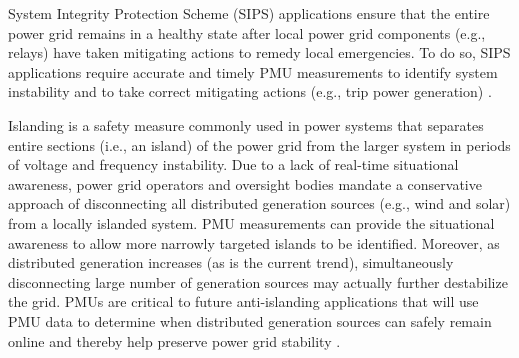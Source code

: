System Integrity Protection Scheme (SIPS) applications ensure that the entire power grid remains in a healthy state after local power grid components (e.g., relays) 
have taken mitigating actions to remedy local emergencies.  
To do so, SIPS applications require accurate and timely PMU measurements to identify system instability and to take correct mitigating actions (e.g., trip power generation) \cite{Bakken11}.



Islanding is a safety measure commonly used in power systems that separates entire sections (i.e., an island) of the power grid from the larger system in periods of voltage and frequency 
instability.  Due to a lack of real-time situational awareness, power grid operators and oversight bodies mandate a conservative approach of disconnecting all distributed generation sources 
(e.g., wind and solar) from a locally islanded system. PMU measurements can provide the situational awareness to allow more narrowly targeted islands to be identified. Moreover,
as distributed generation increases (as is the current trend), simultaneously disconnecting large number of generation sources may actually further destabilize the grid.  
PMUs are critical to future anti-islanding applications that will
use PMU data to determine when distributed generation sources can safely remain online and thereby help preserve power grid stability \cite{Bakken11}.

